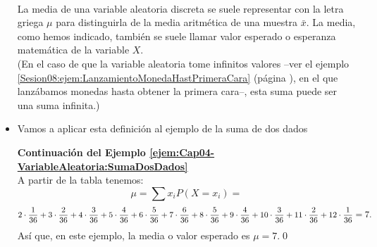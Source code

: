 \begin{itemize}
        \\[3mm]
        La media de una variable aleatoria discreta se suele representar con la letra griega $\mu$ para distinguirla de la media aritmética de una muestra $\bar x$. La media, como hemos indicado, también se suele llamar valor esperado o esperanza matemática de la variable $X$.\\
        (En el caso de que la variable aleatoria tome infinitos valores --ver el ejemplo \ref{Sesion08:ejem:LanzamientoMonedaHastPrimeraCara} (página \pageref{Sesion08:ejem:LanzamientoMonedaHastPrimeraCara}), en el que lanzábamos monedas hasta obtener la primera cara--, esta suma puede ser una suma infinita.)



        \item Vamos a aplicar esta definición al ejemplo de la suma de dos dados
        \begin{Ejemplo} {\bf Continuación del Ejemplo \ref{ejem:Cap04-VariableAleatoria:SumaDosDados}}\\
        A partir de la tabla tenemos:
        \[\mu=\sum x_i P(X=x_i)=\]
        \[\mbox{\small $
        2\cdot\dfrac{1}{36}+3\cdot\dfrac{2}{36}+4\cdot\dfrac{3}{36}+5\cdot\dfrac{4}{36}+6\cdot\dfrac{5}{36}+
        7\cdot\dfrac{6}{36}+8\cdot\dfrac{5}{36}+9\cdot\dfrac{4}{36}+10\cdot\dfrac{3}{36}+11\cdot\dfrac{2}{36}
        +12\cdot\dfrac{1}{36}$}=7.\]
        Así que, en este ejemplo, la media o valor esperado es $\mu=7$.\qed
        \end{Ejemplo}


\end{itemize}
